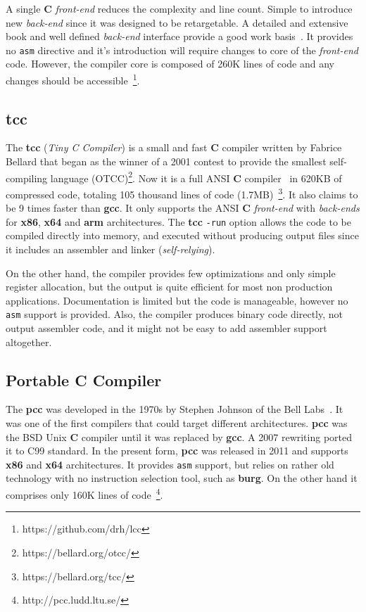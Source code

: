 A single {\bf C} {\it front-end} reduces the complexity and line count.  Simple to
introduce new {\it back-end} since it was designed to be retargetable.  A detailed and
extensive book and well defined {\it back-end} interface provide a good work
basis~\cite{hanson95}.  It provides no {\tt asm} directive and it's introduction
will require changes to core of the {\it front-end} code.  However, the compiler core
is composed of 260K lines of code and any changes should be
accessible~\footnote{https://github.com/drh/lcc}.

\subsection{tcc}

The {\bf tcc} ({\em Tiny C Compiler}) is a small and fast {\bf C} compiler
written by Fabrice Bellard that began as the winner of a 2001 contest to
provide the smallest self-compiling language
({\sc OTCC})\footnote{https://bellard.org/otcc/}.
Now it is a full {\sc ANSI} {\bf C} compiler~\cite{Wheeler:2005} in 620KB of compressed code, totaling 105 thousand lines of code
(1.7MB)~\footnote{https://bellard.org/tcc/}.  It also claims to be 9 times faster than {\bf gcc}.  It only supports
the {\sc ANSI} {\bf C} {\it front-end} with {\it back-ends} for {\bf x86}, {\bf x64} and
{\bf arm} architectures.  The {\bf tcc} {\tt -run} option allows the code to be
compiled directly into memory, and executed without producing output files since
it includes an assembler and linker ({\em self-relying}).


On the other hand, the compiler provides few optimizations and only simple
register allocation, but the output is quite efficient for most non production
applications.  Documentation is limited but the code is manageable, however no
{\tt asm} support is provided.  Also, the compiler produces binary code
directly, not output assembler code, and it might not be easy to add assembler
support altogether.


\subsection{Portable C Compiler}

The {\bf pcc} was developed in the 1970s by Stephen Johnson of the Bell
Labs~\cite{Johnson:1978}.
It was one of the first compilers that could target different architectures.
{\bf pcc} was the {\sc BSD Unix} {\bf C} compiler until it was replaced by
{\bf gcc}.  A 2007 rewriting ported it to {\sc C99} standard.
In the present form, {\bf pcc} was released in 2011 and supports {\bf x86}
and {\bf x64} architectures. %
It provides {\tt asm} support, but relies on rather old technology with no
instruction selection tool, such as {\bf burg}.
On the other hand it comprises only 160K lines of
code~\footnote{http://pcc.ludd.ltu.se/}.

